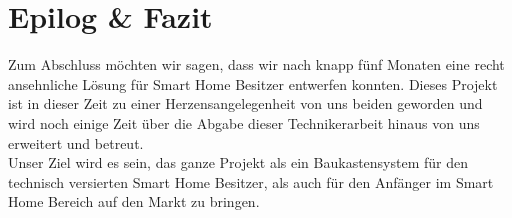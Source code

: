 \section{Epilog \& Fazit}\label{fazit}
Zum Abschluss möchten wir sagen, dass wir nach knapp fünf Monaten eine recht ansehnliche Lösung für Smart Home Besitzer entwerfen konnten. 
Dieses Projekt ist in dieser Zeit zu einer Herzensangelegenheit von uns beiden geworden und wird noch einige Zeit über die Abgabe dieser Technikerarbeit hinaus von uns erweitert und betreut.\\
\noindent Unser Ziel wird es sein, das ganze Projekt als ein Baukastensystem für den technisch versierten Smart Home Besitzer, als auch für den Anfänger im Smart Home Bereich auf den Markt zu bringen.
%


%
\newpage